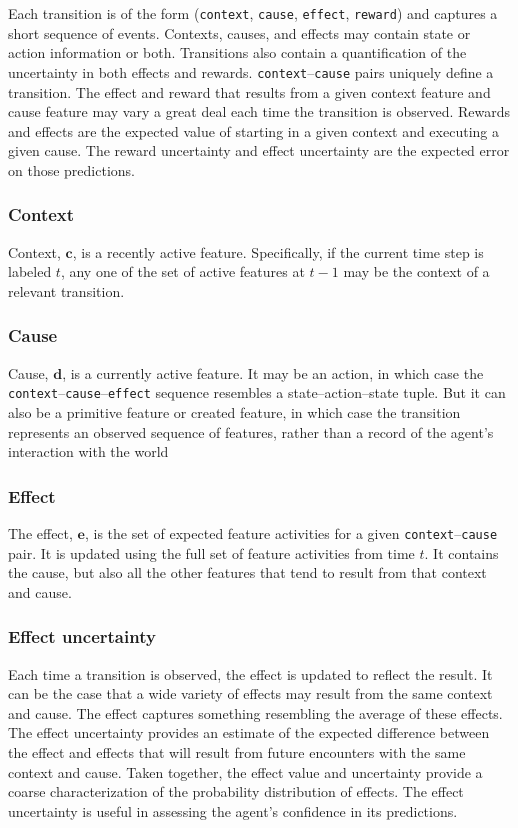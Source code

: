 Each transition is of the form (\texttt{context}, \texttt{cause}, \texttt{effect}, \texttt{reward}) and captures a short sequence of events. Contexts, causes, and effects may contain state or action information or both. Transitions also contain a quantification of the uncertainty in both effects and rewards. \texttt{context}--\texttt{cause} pairs uniquely define a transition. The effect and reward that results from a given context feature and cause feature may vary a great deal each time the transition is observed. Rewards and effects are the expected value of starting in a given context and executing a given cause. The reward uncertainty and effect uncertainty are the expected error on those predictions.

\subsubsection{Context}
Context, $\mathbf{c}$, is a recently active feature. Specifically, if the current time step is labeled $t$, any one of the set of active features at $t-1$ may be the context of a relevant transition. 

\subsubsection{Cause}
Cause, $\mathbf{d}$, is a currently active feature. It may be an action, in which case the \texttt{context}--\texttt{cause}--\texttt{effect} sequence resembles a state--action--state tuple. But it can also be a primitive feature or created feature, in which case the transition represents an observed sequence of features, rather than a record of the agent's interaction with the world

\subsubsection{Effect}
The effect, $\mathbf{e}$, is the set of expected feature activities for a given \texttt{context}--\texttt{cause} pair. It is updated using the full set of feature activities from time $t$. It contains the cause, but also all the other features that tend to result from that context and cause.

\subsubsection{Effect uncertainty}
Each time a transition is observed, the effect is updated to reflect the result. It can be the case that a wide variety of effects may result from the same context and cause. The effect captures something resembling the average of these effects. The effect uncertainty provides an estimate of the expected difference between the effect and effects that will result from future encounters with the same context and cause. Taken together, the effect value and uncertainty provide a coarse characterization of the probability distribution of effects. The effect uncertainty is useful in assessing the agent's confidence in its predictions.

